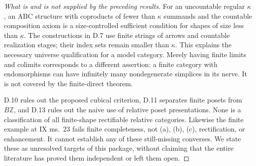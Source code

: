 \begin{proof}[What is and is not supplied by the preceding results]
For an uncountable regular $\kappa$, an ABC structure with
coproducts of fewer than $\kappa$ summands and the countable
composition axiom is a size-controlled sufficient condition for
shapes of size less than $\kappa$. The constructions in D.7 use
finite strings of arrows and countable realization stages; their
index sets remain smaller than $\kappa$. This explains the
necessary universe qualification for a model category. Merely
having finite limits and colimits corresponds to a different
assertion: a finite category with endomorphisms can have infinitely
many nondegenerate simplices in its nerve. It is not covered by
the finite-direct theorem.

D.10 rules out the proposed cubical criterion, D.11 separates
finite posets from $B\mathbb Z$, and D.13 rules out the naive use
of relative poset presentations. None is a classification of all
finite-shape rectifiable relative categories. Likewise the finite
example at IX ms.~23 fails finite completeness, not (a), (b),
(c), rectification, or enhancement. It cannot establish any of
these still-missing converses. We state these as unresolved targets
of this package, without claiming that the entire literature has
proved them independent or left them open.
\end{proof}

